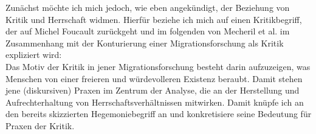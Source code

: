 \noindent Zunächst möchte ich mich jedoch, wie eben angekündigt, der Beziehung von
Kritik und Herrschaft widmen. Hierfür beziehe ich mich auf einen Kritikbegriff,
der auf Michel Foucault zurückgeht und im folgenden von Mecheril et
al.\footnotemark {} im
Zusammenhang mit der Konturierung einer Migrationsforschung als Kritik
expliziert wird:\\ 
Das Motiv der Kritik in jener Migrationsforschung
besteht darin aufzuzeigen, was Menschen von einer freieren und würdevolleren
Existenz beraubt. Damit stehen jene (diskursiven) Praxen im Zentrum der
Analyse, die an der Herstellung und Aufrechterhaltung von
Herrschaftsverhältnissen mitwirken.\footnotemark {}
Damit knüpfe ich an den bereits
skizzierten Hegemoniebegriff an und konkretisiere seine Bedeutung für Praxen
der Kritik.\\ 

